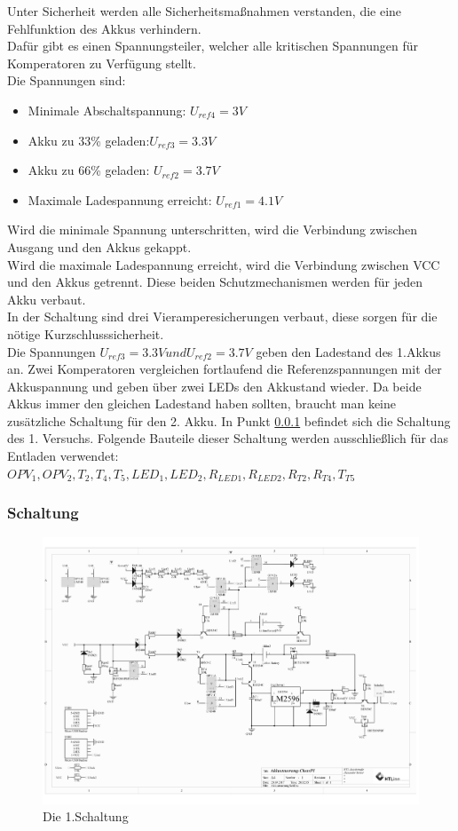 \documentclass[12pt,a4paper]{article}
\begin{document}
{Unter Sicherheit werden alle Sicherheitsmaßnahmen verstanden, die eine Fehlfunktion des Akkus verhindern. \\
Dafür gibt es einen Spannungsteiler, welcher alle kritischen Spannungen für Komperatoren zu Verfügung stellt. \\
Die Spannungen sind: 
\begin{itemize}
	\item{Minimale Abschaltspannung: $U_{ref4} = 3 V$}
	\item{Akku zu 33\% geladen:$ U_{ref3}=3.3V$}
	\item{Akku zu 66\% geladen: $U_{ref2} = 3.7V$}
	\item{Maximale Ladespannung erreicht: $U_{ref1} = 4.1V$}
\end{itemize}

Wird die minimale Spannung unterschritten, wird die Verbindung zwischen Ausgang und den Akkus gekappt. \\
Wird die maximale Ladespannung erreicht, wird die Verbindung zwischen VCC und den Akkus getrennt. Diese beiden Schutzmechanismen werden für jeden Akku verbaut.\\
In der Schaltung sind drei Vieramperesicherungen verbaut, diese sorgen für die nötige Kurzschlusssicherheit.  \\
Die Spannungen $ U_{ref3}=3.3V und U_{ref2} = 3.7V$ geben den Ladestand des 1.Akkus an. Zwei Komperatoren vergleichen fortlaufend die Referenzspannungen mit der Akkuspannung und geben über zwei LEDs den Akkustand wieder. Da beide Akkus immer den gleichen Ladestand haben sollten, braucht man keine zusätzliche Schaltung für den 2. Akku.
In Punkt \ref{SUBSUBSEC:CIRCUIT-1} befindet sich die Schaltung des 1. Versuchs. Folgende Bauteile dieser Schaltung werden ausschließlich für das Entladen verwendet:\\ $OPV_1, OPV_2,T_2,T_4, T_5,LED_1,LED_2,R_{LED1},R_{LED2},R_{T2}, R_{T4},T_{T5}$ 
\newpage
\subsubsection{Schaltung}
\label{SUBSUBSEC:CIRCUIT-1}
\begin{figure}[H]
  \centering
		\includegraphics[scale=0.7, angle=90]{graphics/20170920-Shematic.pdf}
		\caption{Die 1.Schaltung}
		\label{fig:circuit1}
\end{figure}

}
\end{document}
